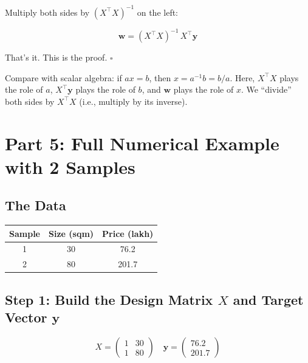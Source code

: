 \documentclass[11pt, a4paper]{article}
\newcommand{\gut}[1]{\begin{tcolorbox}[colback=lightyellow, colframe=orange!50, title=Gut feeling]#1\end{tcolorbox}}
\begin{document}
Multiply both sides by $(X^\top X)^{-1}$ on the left:

\begin{equation}
\boxed{\mathbf{w} = (X^\top X)^{-1} \, X^\top \mathbf{y}}
\tag{OLS-14}
\end{equation}

That's it. This is the proof. $\square$

\gut{
Compare with scalar algebra: if $ax = b$, then $x = a^{-1}b = b/a$. Here, $X^\top X$ plays the role of $a$, $X^\top \mathbf{y}$ plays the role of $b$, and $\mathbf{w}$ plays the role of $x$. We ``divide'' both sides by $X^\top X$ (i.e., multiply by its inverse).
}


\newpage
\section*{\color{secblue}Part 5: Full Numerical Example with 2 Samples}

\subsection*{The Data}

\begin{center}
\begin{tabular}{ccc}
\toprule
\textbf{Sample} & \textbf{Size (sqm)} & \textbf{Price (lakh)} \\
\midrule
1 & 30 & 76.2 \\
2 & 80 & 201.7 \\
\bottomrule
\end{tabular}
\end{center}


\subsection*{Step 1: Build the Design Matrix $X$ and Target Vector $\mathbf{y}$}

\begin{equation}
X = \begin{pmatrix} 1 & 30 \\ 1 & 80 \end{pmatrix}
\quad
\mathbf{y} = \begin{pmatrix} 76.2 \\ 201.7 \end{pmatrix}
\tag{N-1}
\end{equation}
\end{document}
